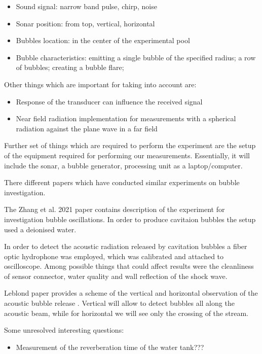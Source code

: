 \begin{itemize}
    \item  Sound signal: narrow band pulse, chirp, noise
    \item Sonar position: from top, vertical, horizontal
    \item Bubbles location: in the center of the experimental pool
   \item Bubble characteristics: emitting a single bubble of the specified radius; a row of bubbles; 
   creating a bubble flare;
\end{itemize}
Other things which are important for taking into account are:
\begin{itemize}
    \item Response of the transducer can influence the received signal
    \item Near field radiation implementation for measurements with a spherical radiation against the plane wave in a far field
\end{itemize}

Further set of things which are required to perform the experiment are the setup of the equipment required for performing our measurements. 
Essentially, it will include the sonar, a bubble generator, processing unit as a laptop/computer.

There different papers which have conducted similar experiments on bubble investigation. 

The Zhang et al. 2021 \cite{zhang_experimental_2021} paper contains description of the experiment for investigation bubble oscillations. In order to produce cavitaion bubbles the setup used a deionised water.

In order to detect the acoustic radiation released by cavitation bubbles a fiber optic hydrophone was employed, which was calibrated and attached to oscilloscope.  
Among possible things that could affect results were the cleanliness of sensor connector, water quality and wall reflection of the shock wave.

Leblond paper provides a scheme of the vertical and horizontal observation of the acoustic bubble release \cite{leblond_acoustic_2014}. Vertical will allow to detect bubbles all along the acoustic beam, while for horizontal we will see only the crossing of the stream.

Some unresolved interesting questions:
\begin{itemize}
    \item Measurement of the reverberation time of the water tank???
\end{itemize}

